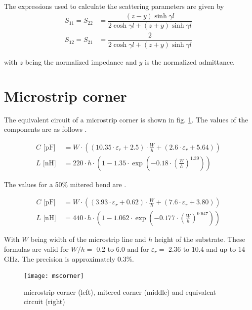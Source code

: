 \documentclass[10pt]{report}
\begin{document}
The expressions used to calculate the scattering parameters are given
by
\begin{align}
S_{11} = S_{22} &= \dfrac{\left(z - y\right) \sinh{\gamma l}}{2\cosh{\gamma l} + \left(z + y\right) \sinh{\gamma l}}\\
S_{12} = S_{21} &= \dfrac{2}{2\cosh{\gamma l} + \left(z + y\right) \sinh{\gamma l}}
\end{align}

with $z$ being the normalized impedance and $y$ is the normalized
admittance.

\section{Microstrip corner}

The equivalent circuit of a microstrip corner is shown in fig.
\ref{fig:MScorner}.  The values of the components are as follows
\cite{Kirschning4}.

\begin{align}
C \text{ [pF] } &= W \cdot \left( (10.35\cdot\varepsilon_r + 2.5) \cdot \frac{W}{h} +
			       (2.6\cdot\varepsilon_r + 5.64) \right)\\
L \text{ [nH] } &= 220\cdot h \cdot \left( 1 - 1.35\cdot\exp\left( -0.18\cdot
		   \left( \frac{W}{h} \right)^{1.39} \right) \right)
\end{align}

The values for a 50\% mitered bend are \cite{Kirschning4}.

\begin{align}
C \text{ [pF] } &= W \cdot \left( (3.93\cdot\varepsilon_r + 0.62) \cdot \frac{W}{h} +
			       (7.6\cdot\varepsilon_r + 3.80) \right)\\
L \text{ [nH]} &= 440\cdot h \cdot \left( 1 - 1.062\cdot\exp\left( -0.177\cdot
		   \left( \frac{W}{h} \right)^{0.947} \right) \right)
\end{align}

With $W$ being width of the microstrip line and $h$ height of the
substrate.  These formulas are valid for $W/h = $ 0.2 to 6.0 and for
$\varepsilon_r = $ 2.36 to 10.4 and up to 14 GHz. The precision is
approximately 0.3\%.

\begin{figure}[ht]
\begin{center}
\texttt{[image: mscorner]}
\end{center}
\caption{microstrip corner (left), mitered corner (middle) and equivalent circuit (right)}
\label{fig:MScorner}
\end{figure}
\FloatBarrier
\end{document}
